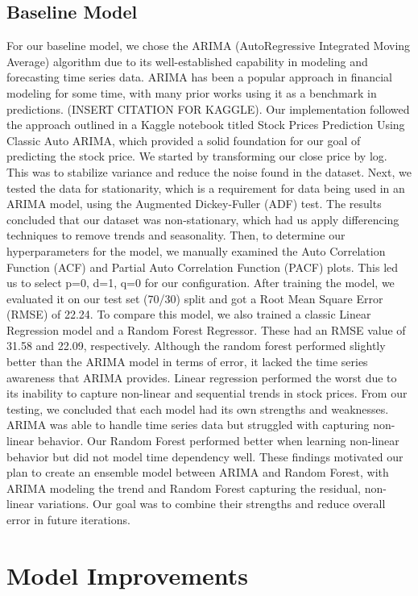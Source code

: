 \documentclass[conference]{IEEEtran}
\begin{document}
\subsection{Baseline Model}

For our baseline model, we chose the ARIMA (AutoRegressive Integrated Moving Average) algorithm due to its well-established capability in modeling and forecasting time series data. ARIMA has been a popular approach in financial modeling for some time, with many prior works using it as a benchmark in predictions. (INSERT CITATION FOR KAGGLE).
Our implementation followed the approach outlined in a Kaggle notebook titled Stock Prices Prediction Using Classic Auto ARIMA, which provided a solid foundation for our goal of predicting the stock price. We started by transforming our close price by log. This was to stabilize variance and reduce the noise found in the dataset. Next, we tested the data for stationarity, which is a requirement for data being used in an ARIMA model, using the Augmented Dickey-Fuller (ADF) test. The results concluded that our dataset was non-stationary, which had us apply differencing techniques to remove trends and seasonality.
Then, to determine our hyperparameters for the model, we manually examined the Auto Correlation Function (ACF) and Partial Auto Correlation Function (PACF) plots. This led us to select p=0, d=1, q=0 for our configuration. After training the model, we evaluated it on our test set (70/30) split and got a Root Mean Square Error (RMSE) of 22.24.
To compare this model, we also trained a classic Linear Regression model and a Random Forest Regressor. These had an RMSE value of 31.58 and 22.09, respectively. Although the random forest performed slightly better than the ARIMA model in terms of error, it lacked the time series awareness that ARIMA provides. Linear regression performed the worst due to its inability to capture non-linear and sequential trends in stock prices.
From our testing, we concluded that each model had its own strengths and weaknesses. ARIMA was able to handle time series data but struggled with capturing non-linear behavior. Our Random Forest performed better when learning non-linear behavior but did not model time dependency well. 
These findings motivated our plan to create an ensemble model between ARIMA and Random Forest, with ARIMA modeling the trend and Random Forest capturing the residual, non-linear variations. Our goal was to combine their strengths and reduce overall error in future iterations.

\section{Model Improvements}
\end{document}
